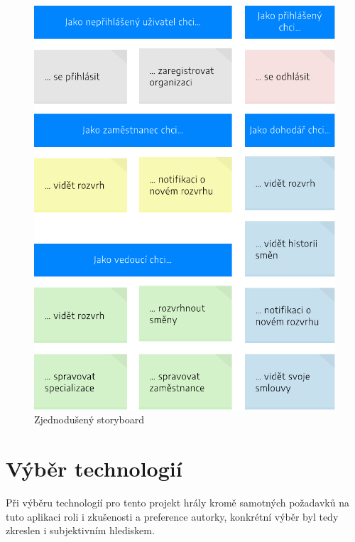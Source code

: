 \documentclass[twoside]{ctuthesis}
\begin{document}
\begin{figure}[h!]
	\includegraphics[scale=0.8]{user-stories.pdf}
	\caption{Zjednodušený storyboard}
	\label{fig:user-stories}
\end{figure}

% 
%
%
% 		


\newpage

\chapter{Výběr technologií}
Při výběru technologií pro tento projekt hrály kromě samotných požadavků na tuto aplikaci roli i zkušenosti a preference autorky, konkrétní výběr byl tedy zkreslen i subjektivním hlediskem.
\end{document}
